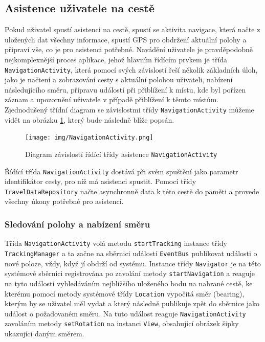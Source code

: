 \documentclass[czech,master,public,dept460,male,java,cpdeclaration]{diploma}
\begin{document}
\subsection{Asistence uživatele na cestě}
Pokud uživatel spustí asistenci na cestě, spustí se aktivita navigace, která načte z uložených
dat všechny informace, spustí GPS pro obdržení aktuální polohy a připraví vše, co je pro asistenci potřebné.
Navádění uživatele je pravděpodobně nejkomplexnější proces aplikace, jehož hlavním řídícím prvkem
je třída \texttt{NavigationActivity}, která
pomocí svých závislostí řeší několik základních úloh, jako je načtení a zobrazování cesty s aktuální polohou uživateli,
nabízení následujícího směru, přípravu událostí při přiblížení k místu, kde byl pořízen záznam a upozornění
uživatele v případě přiblížení k těmto místům. Zjednodušený třídní diagram se závislostmi třídy \texttt{NavigationActivity}
můžeme vidět na obrázku \ref{fig:navigationactivitydependencies}, který bude následně blíže popsán.

\begin{figure}[H]
        \centering
                \texttt{[image: img/NavigationActivity.png]}
        \caption{Diagram závislostí řídící třídy asistence \texttt{NavigationActivity}}
        \label{fig:navigationactivitydependencies}
\end{figure}

Řídící třída \texttt{NavigationActivity} dostává při svém spuštění jako parametr identifikátor cesty,
pro níž má asistenci spustit. Pomocí třídy \texttt{TravelDataRepository} načte asynchronně data k této cestě
do paměti a provede všechny úkony potřebné pro asistenci.

\subsubsection{Sledování polohy a nabízení směru}
Třída \texttt{NavigationActivity} volá metodu \texttt{startTracking} instance třídy \texttt{TrackingManager}
a ta začne na sběrnici událostí \texttt{EventBus} publikovat události o nové poloze, vždy, když jí
obdrží od systému.
Instance třídy \texttt{Navigator} je na této systémové sběrnici registrována po zavolání metody \texttt{startNavigation}
a reaguje na tyto události vyhledáváním nejbližšího uloženého bodu na nahrané cestě, ke kterému pomocí metody
systémové třídy \texttt{Location} vypočítá směr (bearing), kterým by se uživatel měl vydat a který následně publikuje zpět do sběrnice
 jako událost o požadovaném směru. Na tuto událost reaguje \texttt{NavigationActivity} zavoláním metody \texttt{setRotation}
 na instanci \texttt{View}, obsahující obrázek šipky ukazující daným směrem.
\end{document}
